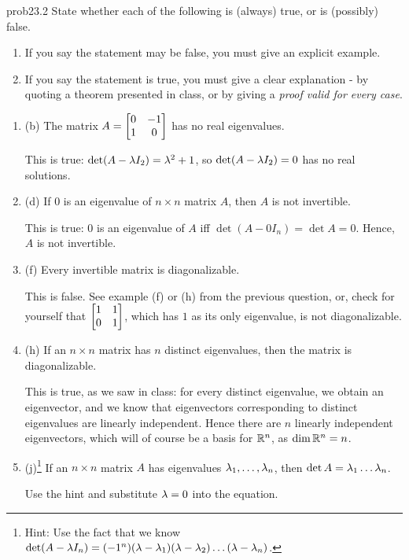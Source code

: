 \begin{sol}{prob23.2} State whether each of the following is (always) true,
or is (possibly) false.     
   \smallskip    
\begin{enumerate}[$\bullet$]
\item If you say the statement may be false, you must give an explicit example.   
\item If you say the statement is true, you must give a clear explanation -   by quoting a theorem presented in class, or by giving a {\it proof valid for every  case}. 
\end{enumerate}

\begin{enumerate}[]


\item (b) The matrix $A=\bmatrix 0&-1\\1&0\endbmatrix$ has no real eigenvalues.

\soln This is true: $\det(A-\lambda I_2) =\lambda^2 +1$, so $\det(A-\lambda I_2)=0$ has no real solutions. 
\medskip
%


\item (d) If $0$ is an eigenvalue of  $n \times n$ matrix  $A$, then $A$ is
not invertible.

\soln This is true: $0$ is an eigenvalue of $A$ iff $\det(A-0I_n)=\det A=0$. Hence, $A$ is
not invertible.
\medskip
%
 
\item (f) Every invertible matrix is diagonalizable.

\soln This is false. See example (f) or (h) from the previous question, or, check for yourself that $\bmatrix 1&1\\0&1\endbmatrix$, which has $1$ as its only eigenvalue, is not  diagonalizable.
\medskip
 
\item (h) If an $n \times n$ matrix has $n$ distinct eigenvalues, then the matrix is diagonalizable.

\soln This is true, as we saw in class: for every distinct eigenvalue, we obtain an eigenvector, and we know that eigenvectors corresponding to distinct eigenvalues are linearly independent. Hence there are $n$ linearly independent eigenvectors, which will of course be a basis for $\mathbb{R}^n$, as $\dim \mathbb{R}^n=n$.
\medskip
%


\item (j)\footnote{ Hint: Use the fact that we know $\det(A-\lambda I_n)=(-1^n)(\lambda-\lambda_1)(\lambda-\lambda_2)\dots(\lambda-\lambda_n) $.} If an  $n \times n$ matrix  $A$ has eigenvalues $\lambda_1, \dots ,\lambda_n$, then $\det A=\lambda_1 \dots\lambda_n $.

\soln Use the hint and substitute $\lambda=0$ into the equation.
\medskip


\end{enumerate}
\end{sol}
